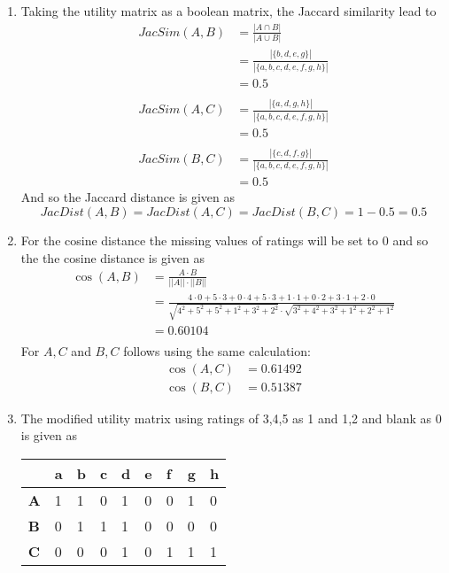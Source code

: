 \begin{enumerate}[label=(\alph*)]
    \item Taking the utility matrix as a boolean matrix, the Jaccard similarity lead to
    \begin{align*}
        JacSim(A,B) &= \frac{|A \cap B|}{|A \cup B|} \\
                &= \frac{|\{b,d,e,g\}|}{|\{a,b,c,d,e,f,g,h\}|} \\
                &= 0.5 \\ \\
        JacSim(A,C) &= \frac{|\{a,d,g,h\}|}{|\{a,b,c,d,e,f,g,h\}|} \\
                &= 0.5 \\ \\
        JacSim(B,C) &= \frac{|\{c,d,f,g\}|}{|\{a,b,c,d,e,f,g,h\}|} \\
                &= 0.5
    \end{align*}
    And so the Jaccard distance is given as
    \[JacDist(A,B) = JacDist(A,C) = JacDist(B,C) = 1-0.5 = 0.5\]
    \item For the cosine distance the missing values of ratings will be set to 0 and so the the cosine distance is given as 
    \begin{align*}
        \cos(A,B) &= \frac{A \cdot B}{||A|| \cdot ||B||} \\
                &=  \frac{4 \cdot 0 + 5 \cdot 3 + 0 \cdot 4 + 5 \cdot 3 + 1 \cdot 1 + 0 \cdot 2 + 3 \cdot 1 + 2 \cdot 0}{\sqrt{4^2 + 5^2 + 5^2 + 1^2 + 3^2 + 2^2} \cdot \sqrt{3^2 + 4^2 + 3^2 + 1^2 + 2^2 + 1^2}} \\
                &= 0.60104 \\
    \end{align*}
    For $A, C$ and $B, C$ follows using the same calculation:
    \begin{align*}
        \cos(A,C) &= 0.61492 \\
        \cos(B,C) &= 0.51387
    \end{align*}
    \item The modified utility matrix using ratings of 3,4,5 as 1 and 1,2 and blank as 0 is given as
    
    \begin{table}[!htb]
        \centering
        \begin{tabular}{lllllllll}
        \hline
                   & \textbf{a} & \textbf{b} & \textbf{c} & \textbf{d} & \textbf{e} & \textbf{f} & \textbf{g} & \textbf{h} \\ \hline
        \textbf{A} & 1          & 1          & 0          & 1          & 0          & 0          & 1          & 0          \\
        \textbf{B} & 0          & 1          & 1          & 1          & 0          & 0          & 0          & 0          \\
        \textbf{C} & 0          & 0          & 0          & 1          & 0          & 1          & 1          & 1          \\ \hline
        \end{tabular}
    \end{table}


\end{enumerate}
